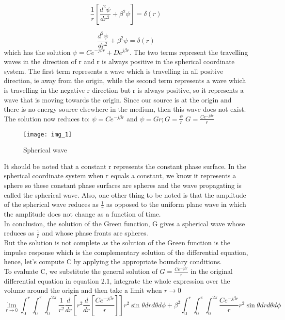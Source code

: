 	$$\frac{1}{r}[\frac{d^{2}\psi}{dr^{2}} + \beta^{2}\psi] = \delta(r)$$
	
	$$\frac{d^{2}\psi}{dr^{2}} + \beta^{2}\psi = \delta(r)$$
	which has the solution $\psi = Ce^{-j\beta r} + De^{j\beta r}$. The two terms represent the travelling waves in the direction of r and r is always positive in the spherical  coordinate system. The first term represents a wave which is travelling in all positive direction, ie away from the origin, while the second term represents a wave which is travelling in the negative r direction but r is always positive, so it represents a wave that is moving towards the origin. Since our source is at the origin and there is no energy source elsewhere in the medium, then this wave does not exist. The solution now reduces to:
	$\psi = Ce^{-j\beta r}$ and $\psi = Gr; G = \frac{\psi}{r}$
	$G = \frac{Ce^{-j\beta r}}{r}$
	\begin{figure}[h]
		\vspace{-20pt}
		\texttt{[image: img\_1]}
		\centering
		\caption{Spherical wave}
		\label{fig:1}
	\end{figure}
	It should be noted that a constant r represents the constant phase surface. In the spherical coordinate system when r equals a constant, we know it represents a sphere so these constant phase surfaces are spheres and the wave propagating is called the spherical wave. Also, one other thing to be noted is that the amplitude of the spherical wave reduces as $\frac{1}{r}$ as opposed to the uniform  plane wave in which the amplitude does not change as a function of time.\\
	In conclusion, the solution of the Green function, G gives a spherical wave whose  reduces as  $\frac{1}{r}$ and whose phase fronts are spheres.\\
	But the solution is not complete as the solution of the Green function is the impulse response which is the complementary solution  of the differential equation, hence, let's compute C by applying the appropriate boundary conditions.\\
	To evaluate C, we substitute the general solution of $G = \frac{Ce^{-j\beta r}}{r}$ in the original differential equation in equation 2.1, integrate the whole expression over the volume around the origin and then take a limit when $r\rightarrow0$
	\begin{dmath*}
		\lim\limits_{r\rightarrow0} \int_{0}^{r} \int_{0}^{\pi}\int_{0}^{2\pi}\frac{1}{r^{2}}\frac{d}{dr}\left[{r^{2}}\frac{d}{dr}\left[\frac{Ce^{-j\beta r}}{r}\right]\right]r^{2}\sin\theta dr d\theta d\phi + \beta^{2} \int_{0}^{r} \int_{0}^{\pi}\int_{0}^{2\pi}\frac{Ce^{-j\beta r}}{r}r^{2}\sin\theta drd\theta d\phi
	\end{dmath*}
	
